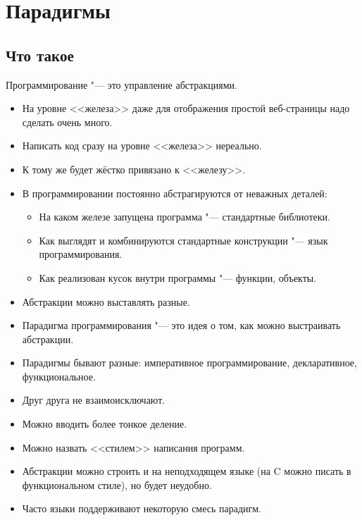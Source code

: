 \section{Парадигмы}
\subsection{Что такое}

\begin{frame}
\end{frame}

\begin{frame}
	\begin{exampleblock}{}
		\large
		\vskip5mm
		Программирование "--- это управление абстракциями.
	\end{exampleblock}
	\begin{itemize}
		\item На уровне <<железа>> даже для отображения простой веб-страницы надо сделать очень много.
		\item Написать код сразу на уровне <<железа>> нереально.
		\item К тому же будет жёстко привязано к <<железу>>.
		\item В программировании постоянно абстрагируются от неважных деталей:
			\begin{itemize}
				\item На каком железе запущена программа "--- стандартные библиотеки.
				\item Как выглядят и комбинируются стандартные конструкции "--- язык программирования.
				\item Как реализован кусок внутри программы "--- функции, объекты.
			\end{itemize}
	\end{itemize}
\end{frame}

\begin{frame}
	\begin{itemize}
		\item Абстракции можно выставлять разные.
		\item Парадигма программирования "--- это идея о том, как можно выстраивать абстракции.
		\item Парадигмы бывают разные: императивное программирование, декларативное, функциональное.
		\item Друг друга не взаимоисключают.
		\item Можно вводить более тонкое деление.
		\item Можно назвать <<стилем>> написания программ.
		\item Абстракции можно строить и на неподходящем языке (на C можно писать в функциональном стиле), но будет неудобно.
		\item Часто языки поддерживают некоторую смесь парадигм.
	\end{itemize}
\end{frame}

